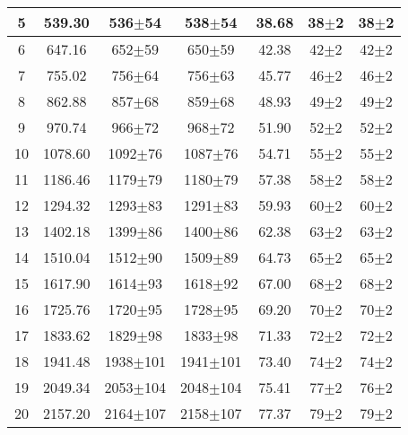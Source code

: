 \begin{table}
\begin{tabular}{|c|c|c|c|c|c|c|}
5&539.30&536$\pm$54&538$\pm$54&38.68&38$\pm$2&38$\pm$2\\ \hline 
6&647.16&652$\pm$59&650$\pm$59&42.38&42$\pm$2&42$\pm$2\\ \hline 
7&755.02&756$\pm$64&756$\pm$63&45.77&46$\pm$2&46$\pm$2\\ \hline 
8&862.88&857$\pm$68&859$\pm$68&48.93&49$\pm$2&49$\pm$2\\ \hline 
9&970.74&966$\pm$72&968$\pm$72&51.90&52$\pm$2&52$\pm$2\\ \hline 
10&1078.60&1092$\pm$76&1087$\pm$76&54.71&55$\pm$2&55$\pm$2\\ \hline 
11&1186.46&1179$\pm$79&1180$\pm$79&57.38&58$\pm$2&58$\pm$2\\ \hline 
12&1294.32&1293$\pm$83&1291$\pm$83&59.93&60$\pm$2&60$\pm$2\\ \hline 
13&1402.18&1399$\pm$86&1400$\pm$86&62.38&63$\pm$2&63$\pm$2\\ \hline 
14&1510.04&1512$\pm$90&1509$\pm$89&64.73&65$\pm$2&65$\pm$2\\ \hline 
15&1617.90&1614$\pm$93&1618$\pm$92&67.00&68$\pm$2&68$\pm$2\\ \hline 
16&1725.76&1720$\pm$95&1728$\pm$95&69.20&70$\pm$2&70$\pm$2\\ \hline 
17&1833.62&1829$\pm$98&1833$\pm$98&71.33&72$\pm$2&72$\pm$2\\ \hline 
18&1941.48&1938$\pm$101&1941$\pm$101&73.40&74$\pm$2&74$\pm$2\\ \hline 
19&2049.34&2053$\pm$104&2048$\pm$104&75.41&77$\pm$2&76$\pm$2\\ \hline 
20&2157.20&2164$\pm$107&2158$\pm$107&77.37&79$\pm$2&79$\pm$2\\ \hline 
\end{tabular} 
\end{table} 

